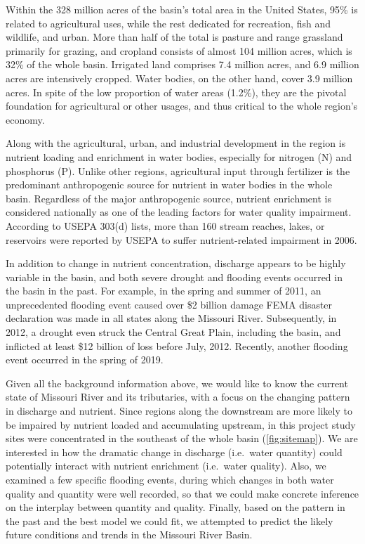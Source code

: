 \documentclass[12pt,]{article}
\begin{document}
Within the 328 million acres of the basin's total area in the United
States, 95\% is related to agricultural uses, while the rest dedicated
for recreation, fish and wildlife, and urban. More than half of the
total is pasture and range grassland primarily for grazing, and cropland
consists of almost 104 million acres, which is 32\% of the whole basin.
Irrigated land comprises 7.4 million acres, and 6.9 million acres are
intensively cropped. Water bodies, on the other hand, cover 3.9 million
acres. In spite of the low proportion of water areas (1.2\%), they are
the pivotal foundation for agricultural or other usages, and thus
critical to the whole region's economy.

Along with the agricultural, urban, and industrial development in the
region is nutrient loading and enrichment in water bodies, especially
for nitrogen (N) and phosphorus (P). Unlike other regions, agricultural
input through fertilizer is the predominant anthropogenic source for
nutrient in water bodies in the whole basin. Regardless of the major
anthropogenic source, nutrient enrichment is considered nationally as
one of the leading factors for water quality impairment. According to
USEPA 303(d) lists, more than 160 stream reaches, lakes, or reservoirs
were reported by USEPA to suffer nutrient-related impairment in 2006.

In addition to change in nutrient concentration, discharge appears to be
highly variable in the basin, and both severe drought and flooding
events occurred in the basin in the past. For example, in the spring and
summer of 2011, an unprecedented flooding event caused over \$2 billion
damage FEMA disaster declaration was made in all states along the
Missouri River. Subsequently, in 2012, a drought even struck the Central
Great Plain, including the basin, and inflicted at least \$12 billion of
loss before July, 2012. Recently, another flooding event occurred in the
spring of 2019.

Given all the background information above, we would like to know the
current state of Missouri River and its tributaries, with a focus on the
changing pattern in discharge and nutrient. Since regions along the
downstream are more likely to be impaired by nutrient loaded and
accumulating upstream, in this project study sites were concentrated in
the southeast of the whole basin (\autoref{fig:sitemap}). We are
interested in how the dramatic change in discharge (i.e.~water quantity)
could potentially interact with nutrient enrichment (i.e.~water
quality). Also, we examined a few specific flooding events, during which
changes in both water quality and quantity were well recorded, so that
we could make concrete inference on the interplay between quantity and
quality. Finally, based on the pattern in the past and the best model we
could fit, we attempted to predict the likely future conditions and
trends in the Missouri River Basin.
\end{document}

